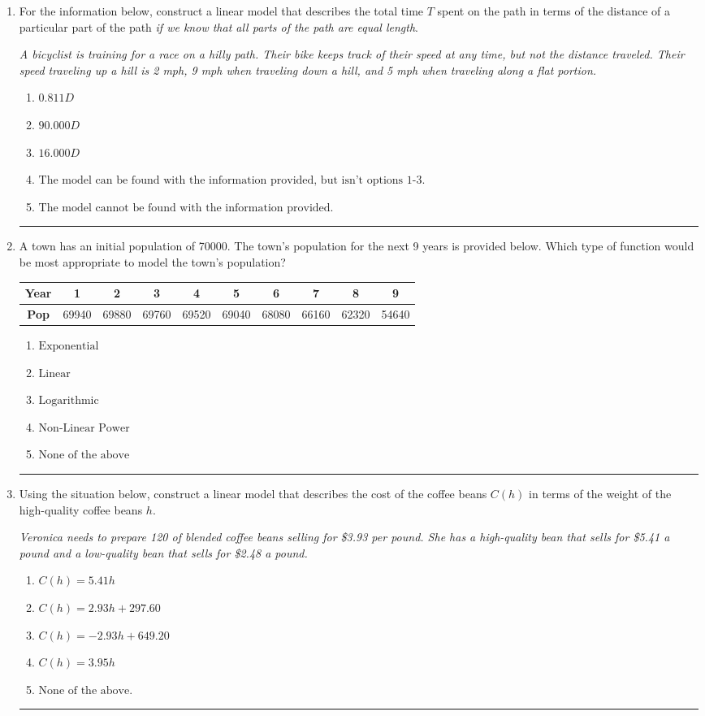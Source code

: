 \documentclass[14pt]{extbook}
\newcommand{\litem}[1]{\item#1\hspace*{-1cm}\rule{\textwidth}{0.4pt}}
\begin{document}
\begin{enumerate}
{\begin{enumerate}[label=\Alph*.]
\end{enumerate} }
\litem{
For the information below, construct a linear model that describes the total time $T$ spent on the path in terms of the distance of a particular part of the path \textit{if we know that all parts of the path are equal length}.
\begin{center}
    \textit{ A bicyclist is training for a race on a hilly path. Their bike keeps track of their speed at any time, but not the distance traveled. Their speed traveling up a hill is 2 mph, 9 mph when traveling down a hill, and 5 mph when traveling along a flat portion. }
\end{center}
\begin{enumerate}[label=\Alph*.]
\item \( 0.811 D \)
\item \( 90.000 D \)
\item \( 16.000 D \)
\item \( \text{The model can be found with the information provided, but isn't options 1-3.} \)
\item \( \text{The model cannot be found with the information provided.} \)

\end{enumerate} }
\litem{
A town has an initial population of 70000. The town's population for the next 9 years is provided below. Which type of function would be most appropriate to model the town's population?

\begin{tabular}{c|c|c|c|c|c|c|c|c|c}
\textbf{Year} &1 &2 &3 &4 &5 &6 &7 &8 &9\tabularnewline \hline
\textbf{Pop} &69940 &69880 &69760 &69520 &69040 &68080 &66160 &62320 &54640\end{tabular}\begin{enumerate}[label=\Alph*.]
\item \( \text{Exponential} \)
\item \( \text{Linear} \)
\item \( \text{Logarithmic} \)
\item \( \text{Non-Linear Power} \)
\item \( \text{None of the above} \)

\end{enumerate} }
\litem{
Using the situation below, construct a linear model that describes the cost of the coffee beans $C(h)$ in terms of the weight of the high-quality coffee beans $h$.
\begin{center}
    \textit{ Veronica needs to prepare 120 of blended coffee beans selling for \$3.93 per pound. She has a high-quality bean that sells for \$5.41 a pound and a low-quality bean that sells for \$2.48 a pound. }
\end{center}
\begin{enumerate}[label=\Alph*.]
\item \( C(h) = 5.41 h \)
\item \( C(h) = 2.93 h + 297.60 \)
\item \( C(h) = -2.93 h + 649.20 \)
\item \( C(h) = 3.95 h \)
\item \( \text{None of the above.} \)


\end{enumerate}}
\end{enumerate}
\end{document}
